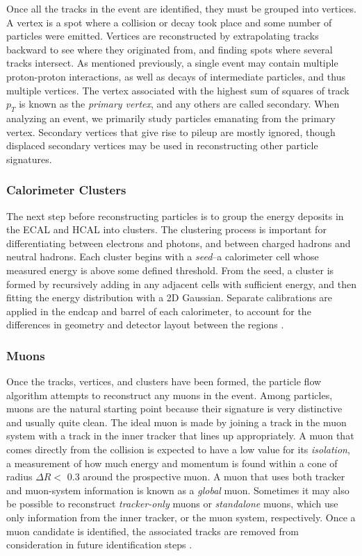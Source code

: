 Once all the tracks in the event are identified, they must be grouped
into vertices. A vertex is a spot where a collision or decay took
place and some number of particles were emitted. Vertices are reconstructed by
extrapolating tracks backward to see where they originated from, and finding
spots where several tracks intersect. As mentioned previously, a
single event may contain multiple proton-proton interactions, as well
as decays of intermediate particles, and thus
multiple vertices. The vertex associated with the highest sum of
squares of track $p_T$ is known as the \emph{primary vertex}, and any
others are called secondary. When analyzing an event, we primarily
study particles emanating from the primary vertex. Secondary
vertices that give rise to pileup are mostly ignored, though displaced
secondary vertices may be used in reconstructing other particle signatures.

\subsubsection{Calorimeter Clusters}
\label{sssec:cms:pf:caloclusters}

The next step before reconstructing particles is to group the energy
deposits in the ECAL and HCAL into clusters. The clustering process
is important for differentiating between electrons and photons, and
between charged hadrons and neutral hadrons. Each cluster begins with
a \emph{seed}--a calorimeter cell whose measured energy is above some defined
threshold. From the seed, a cluster is formed by
recursively adding in any adjacent cells with sufficient energy, and
then fitting the energy distribution with a 2D Gaussian. Separate
calibrations are applied in the endcap and barrel of each calorimeter,
to account for the differences in geometry and detector layout between
the regions \cite{particleflow}.

\subsubsection{Muons}
\label{sssec:cms:pf:muons}

Once the tracks, vertices, and clusters have been formed, the particle
flow algorithm attempts to reconstruct any muons in the
event. Among particles, muons are the natural starting point because their signature is
very distinctive and usually quite clean. The ideal muon is made by joining a
track in the muon system with a track in the inner tracker that lines
up appropriately. A muon that comes directly from the collision is expected
to have a low value for its \emph{isolation}, a measurement of how
much energy and momentum is found within a cone of radius $\Delta R <$
0.3 around the prospective muon. A muon
that uses both tracker and muon-system information is known as a
\emph{global} muon. Sometimes it may also be possible to reconstruct
\emph{tracker-only} muons or \emph{standalone} muons, which use only
information from the inner tracker, or the muon system,
respectively. Once a muon candidate is identified, the associated
tracks are removed from consideration in future identification
steps \cite{particleflow}.

